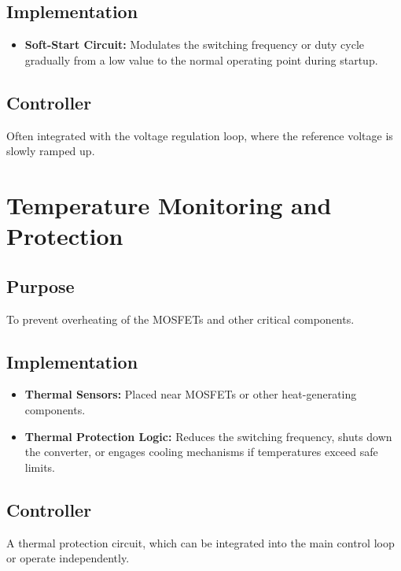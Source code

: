 \documentclass{article}
\begin{document}
\subsection{Implementation}
\begin{itemize}
    \item \textbf{Soft-Start Circuit:} Modulates the switching frequency or duty cycle gradually from a low value to the normal operating point during startup.
\end{itemize}

\subsection{Controller}
Often integrated with the voltage regulation loop, where the reference voltage is slowly ramped up.

\section{Temperature Monitoring and Protection}
\label{sec:temperature_monitoring}
\subsection{Purpose}
To prevent overheating of the MOSFETs and other critical components.

\subsection{Implementation}
\begin{itemize}
    \item \textbf{Thermal Sensors:} Placed near MOSFETs or other heat-generating components.
    \item \textbf{Thermal Protection Logic:} Reduces the switching frequency, shuts down the converter, or engages cooling mechanisms if temperatures exceed safe limits.
\end{itemize}

\subsection{Controller}
A thermal protection circuit, which can be integrated into the main control loop or operate independently.
\end{document}

